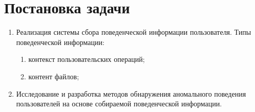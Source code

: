 \chapter{Постановка задачи}

\begin{enumerate}
	\item Реализация системы сбора поведенческой информации пользователя. Типы поведенческой информации:
	\begin{enumerate}
		\item контекст пользовательских операций;
		\item контент файлов;
	\end{enumerate}
	\item Исследование и разработка методов обнаружения аномального поведения пользователей на основе собираемой поведенческой информации.
\end{enumerate}